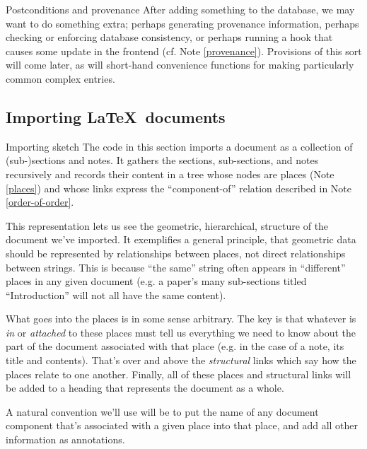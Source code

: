 \begin{notate}{Postconditions and provenance}
After adding something to the database, we may want to do
something extra; perhaps generating provenance
information, perhaps checking or enforcing database
consistency, or perhaps running a hook that causes some
update in the frontend (cf. Note \ref{provenance}).
Provisions of this sort will come later, as will
short-hand convenience functions for making particularly
common complex entries.
\end{notate}

\subsection{Importing \LaTeX\ documents} \label{importing}

\begin{notate}{Importing sketch} \label{importing-sketch}
The code in this section imports a document as a
collection of (sub-)sections and notes.  It gathers the
sections, sub-sections, and notes recursively and records
their content in a tree whose nodes are places (Note
\ref{places}) and whose links express the ``component-of''
relation described in Note \ref{order-of-order}.

This representation lets us see the geometric,
hierarchical, structure of the document we've imported.
It exemplifies a general principle, that geometric data
should be represented by relationships between places, not
direct relationships between strings.  This is because
``the same'' string often appears in ``different'' places
in any given document (e.g. a paper's many sub-sections
titled ``Introduction'' will not all have the same
content).

What goes into the places is in some sense arbitrary.  The
key is that whatever is \emph{in} or \emph{attached} to
these places must tell us everything we need to know about
the part of the document associated with that place
(e.g. in the case of a note, its title and contents).
That's over and above the \emph{structural} links which
say how the places relate to one another.  Finally, all of
these places and structural links will be added to a
heading that represents the document as a whole.

A natural convention we'll use will be to put the name
of any document component that's associated with a given
place into that place, and add all other information as
annotations.
\end{notate}

